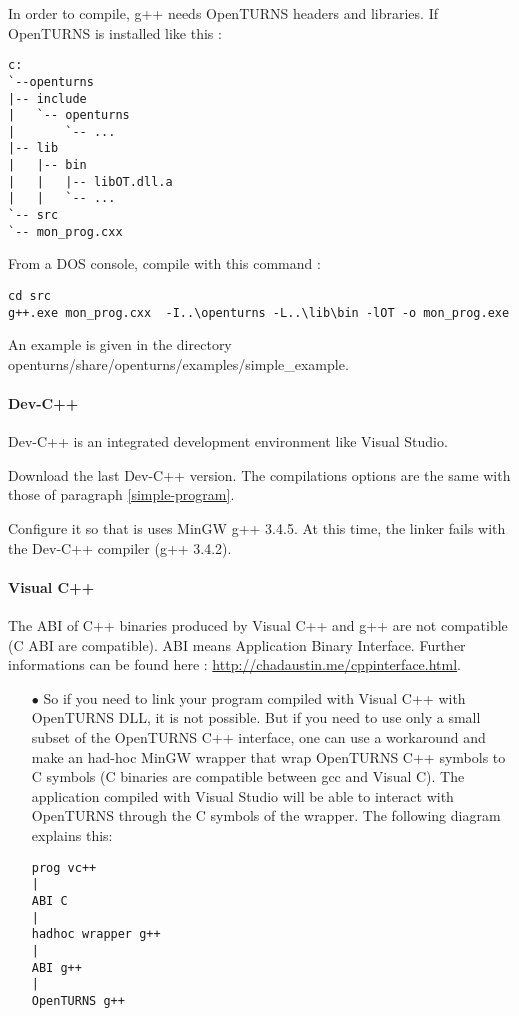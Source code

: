 In order to compile, g++ needs OpenTURNS headers and libraries.
If OpenTURNS is installed like this :
\begin{verbatim}
c:
`--openturns
|-- include
|   `-- openturns
|       `-- ...
|-- lib
|   |-- bin
|   |   |-- libOT.dll.a
|   |   `-- ...
`-- src
`-- mon_prog.cxx
\end{verbatim}

From a DOS console, compile with this command :
\begin{verbatim}
cd src
g++.exe mon_prog.cxx  -I..\openturns -L..\lib\bin -lOT -o mon_prog.exe
\end{verbatim}

An example is given in the directory openturns/share/openturns/examples/simple\_example.

\paragraph{Dev-C++}
Dev-C++ is an integrated development environment like Visual Studio.

Download the last Dev-C++ version.
The compilations options are the same with those of paragraph \ref{simple-program}.

Configure it so that is uses MinGW g++ 3.4.5. At this time, the linker fails with the Dev-C++ compiler (g++ 3.4.2).


\paragraph{Visual C++}

The ABI of C++ binaries produced by Visual C++ and g++ are not compatible (C ABI are compatible). ABI means Application Binary Interface.
Further informations can be found here : \url{http://chadaustin.me/cppinterface.html}.

\begin{itemize}
\item[$\bullet$] So if you need to link your program compiled with Visual C++ with OpenTURNS DLL, it is not possible.
But if you need to use only a small subset of the OpenTURNS C++ interface, one can use a workaround and make an had-hoc MinGW wrapper that wrap OpenTURNS C++ symbols to C symbols (C binaries are compatible between gcc and Visual C). The application compiled with Visual Studio will be able to interact with OpenTURNS through the C symbols of the wrapper. The following diagram explains this:
\begin{verbatim}
prog vc++
|
ABI C
|
hadhoc wrapper g++
|
ABI g++
|
OpenTURNS g++
\end{verbatim}

\end{itemize}

